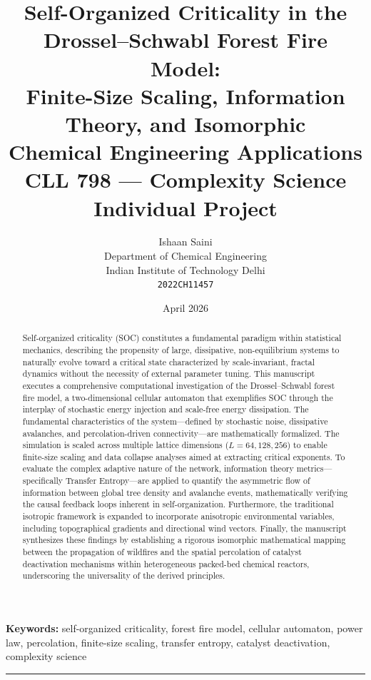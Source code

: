 \documentclass[12pt, a4paper]{article}
\title{
    \vspace{-1cm}
    \textbf{Self-Organized Criticality in the Drossel--Schwabl Forest Fire Model:\\
    Finite-Size Scaling, Information Theory, and Isomorphic\\Chemical Engineering Applications}\\[0.5em]
    \large CLL 798 --- Complexity Science Individual Project
}
\author{
    Ishaan Saini\\
    Department of Chemical Engineering\\
    Indian Institute of Technology Delhi\\
    \texttt{2022CH11457}
}
\date{April 2026}
\begin{document}
\maketitle
\thispagestyle{fancy}

\begin{abstract}
Self-organized criticality (SOC) constitutes a fundamental paradigm within statistical mechanics, describing the propensity of large, dissipative, non-equilibrium systems to naturally evolve toward a critical state characterized by scale-invariant, fractal dynamics without the necessity of external parameter tuning. This manuscript executes a comprehensive computational investigation of the Drossel--Schwabl forest fire model, a two-dimensional cellular automaton that exemplifies SOC through the interplay of stochastic energy injection and scale-free energy dissipation. The fundamental characteristics of the system---defined by stochastic noise, dissipative avalanches, and percolation-driven connectivity---are mathematically formalized. The simulation is scaled across multiple lattice dimensions ($L = 64, 128, 256$) to enable finite-size scaling and data collapse analyses aimed at extracting critical exponents. To evaluate the complex adaptive nature of the network, information theory metrics---specifically Transfer Entropy---are applied to quantify the asymmetric flow of information between global tree density and avalanche events, mathematically verifying the causal feedback loops inherent in self-organization. Furthermore, the traditional isotropic framework is expanded to incorporate anisotropic environmental variables, including topographical gradients and directional wind vectors. Finally, the manuscript synthesizes these findings by establishing a rigorous isomorphic mathematical mapping between the propagation of wildfires and the spatial percolation of catalyst deactivation mechanisms within heterogeneous packed-bed chemical reactors, underscoring the universality of the derived principles.
\end{abstract}

\textbf{Keywords:} self-organized criticality, forest fire model, cellular automaton, power law, percolation, finite-size scaling, transfer entropy, catalyst deactivation, complexity science

\vspace{1em}\hrule\vspace{1em}
\tableofcontents
\newpage
\end{document}
